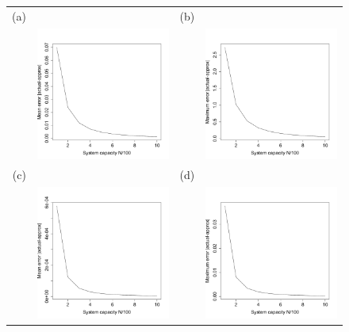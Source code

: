 \documentclass[a4paper]{article}
\begin{document}
     \begin{figure}[th]
\centering
   \begin{tabular}{rrrr}
   (a)&&(b)&\\
  &\includegraphics[width=2.5in]{FDmeanerr.pdf} && \includegraphics[width=2.5in]{FDmaxerr.pdf} \\
  (c)&&(d)&\\
  &\includegraphics[width=2.5in]{FDtmeanerr.pdf} && \includegraphics[width=2.5in]{FDtmaxerr.pdf} \end{tabular}

\end{figure}
\end{document}
